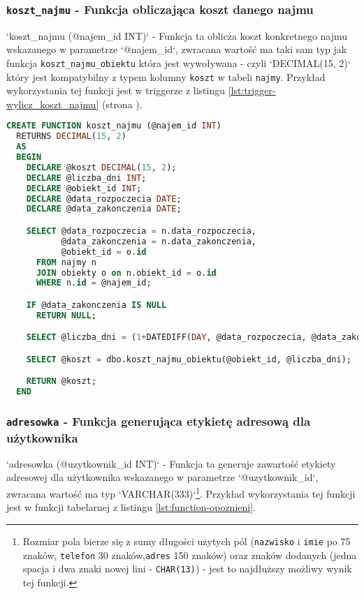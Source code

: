 \subsubsection{\texttt{koszt\_najmu} - Funkcja obliczająca koszt danego najmu}

`koszt_najmu (@najem_id INT)` - Funkcja ta oblicza koszt konkretnego najmu wskazanego w parametrze `@najem_id`, zwracana wartość ma taki sam typ jak funkcja \texttt{koszt\_najmu\_obiektu} która jest wywoływana - czyli `DECIMAL(15, 2)` który jest kompatybilny z typem kolumny \texttt{koszt} w tabeli \texttt{najmy}. Przykład wykorzystania tej funkcji jest w triggerze z listingu \ref{lst:trigger-wylicz_koszt_najmu} (strona \pageref{lst:trigger-wylicz_koszt_najmu}).

\begin{lstlisting}[language=SQL, caption={Skrypt tworzący funkcję skalarną \texttt{koszt\_najmu}}, label={lst:function-koszt_najmu}]
CREATE FUNCTION koszt_najmu (@najem_id INT)
  RETURNS DECIMAL(15, 2)
  AS
  BEGIN
    DECLARE @koszt DECIMAL(15, 2);
    DECLARE @liczba_dni INT;
    DECLARE @obiekt_id INT;
    DECLARE @data_rozpoczecia DATE;
    DECLARE @data_zakonczenia DATE;

    SELECT @data_rozpoczecia = n.data_rozpoczecia,
           @data_zakonczenia = n.data_zakonczenia,
           @obiekt_id = o.id
      FROM najmy n
      JOIN obiekty o on n.obiekt_id = o.id
      WHERE n.id = @najem_id;

    IF @data_zakonczenia IS NULL
      RETURN NULL;

    SELECT @liczba_dni = (1+DATEDIFF(DAY, @data_rozpoczecia, @data_zakonczenia));

    SELECT @koszt = dbo.koszt_najmu_obiektu(@obiekt_id, @liczba_dni);

    RETURN @koszt;
  END
\end{lstlisting}

\subsubsection{\texttt{adresowka} - Funkcja generująca etykietę adresową dla użytkownika}

`adresowka (@uzytkownik_id INT)` - Funkcja ta generuje zawartość etykiety adresowej dla użytkownika wskazanego w parametrze `@uzytkownik_id`, zwracana wartość ma typ `VARCHAR(333)`\footnote{Rozmiar pola bierze się z sumy długości użytych pól (\texttt{nazwisko} i \texttt{imie} po 75 znaków, \texttt{telefon} 30 znaków,\texttt{adres} 150 znaków) oraz znaków dodanych (jedna spacja i dwa znaki nowej lini - \texttt{CHAR(13)}) - jest to najdłuższy możliwy wynik tej funkcji.}. Przykład wykorzystania tej funkcji jest w funkcji tabelarnej z listingu \ref{lst:function-opoznieni}.

